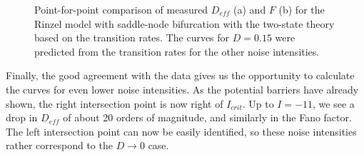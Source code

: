 \documentclass[12pt,a4paper]{article}
\begin{document}
\begin{figure}[H]
	\hspace*{-0.5cm}
	\caption{Point-for-point comparison of measured $D_{eff}$ (a) and $F$ (b) for the Rinzel model with saddle-node bifurcation with the two-state theory based on the transition rates. The curves for $D=0.15$ were predicted from the transition rates for the other noise intensities.}
\end{figure}
Finally, the good agreement with the data gives us the opportunity to calculate the curves for even lower noise intensities. As the potential barriers have already shown, the right intersection point is now right of $I_{crit}$. Up to $I=-11$, we see a drop in $D_{eff}$ of about 20 orders of magnitude, and similarly in the Fano factor. The left intersection point can now be easily identified, so these noise intensities rather correspond to the $D\rightarrow0$ case.
\end{document}
